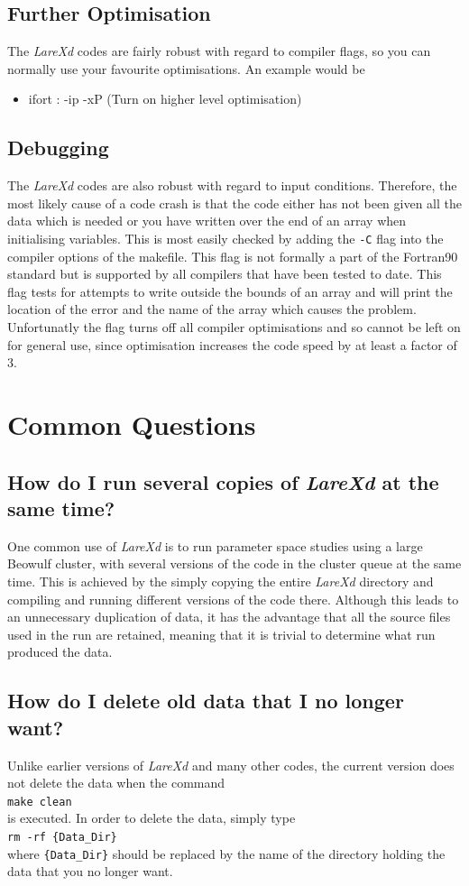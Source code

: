 \documentclass[11pt]{article}
\begin{document}
\subsection{Further Optimisation}
The {\it LareXd} codes are fairly robust with regard to compiler flags, so you can normally use your favourite optimisations. An example would be
\begin{itemize}
\item ifort : -ip -xP (Turn on higher level optimisation)
\end{itemize}
\subsection{Debugging}
The {\it LareXd} codes are also robust with regard to input conditions. Therefore, the most likely cause of a code crash is that the code either has not been given all the data which is needed or you have written over the end of an array when initialising variables. This is most easily checked by adding the \texttt{-C} flag into the compiler options of the makefile. This flag is not formally a part of the Fortran90 standard but is supported by all compilers that have been tested to date. This flag tests for attempts to write outside the bounds of an array and will print the location of the error and the name of the array which causes the problem. Unfortunatly the flag turns off all compiler optimisations and so cannot be left on for general use, since optimisation increases the code speed by at least a factor of 3.

\section{Common Questions}
\subsection*{How do I run several copies of {\it LareXd} at the same time?}
One common use of {\it LareXd} is to run parameter space studies using a large
Beowulf cluster, with several versions of the code in the cluster queue at the
same time. This is achieved by the simply copying the entire {\it
  LareXd} directory and compiling and running different versions of the code
there. Although this leads to an unnecessary duplication of data, it has the
advantage that all the source files used in the run are retained, meaning that
it is trivial to determine what run produced the data.
\subsection*{How do I delete old data that I no longer want?}
Unlike earlier versions of {\it LareXd} and many other codes, the current
version does not delete the data when the command\\
\texttt{make clean}\\
is executed. In order to delete the data, simply type\\
\texttt{rm -rf \{Data\_Dir\}}\\
where \texttt{\{Data\_Dir\}} should be replaced by the name of the directory
holding the data that you no longer want. 
\end{document}
